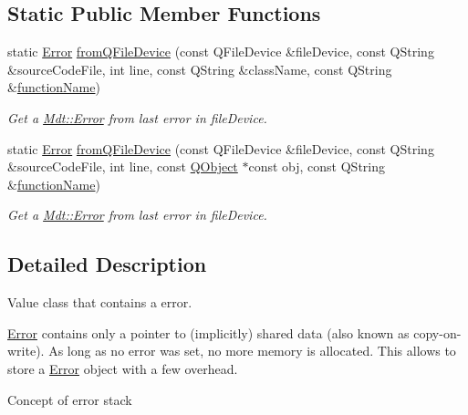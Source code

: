 \subsection*{Static Public Member Functions}
\begin{DoxyCompactItemize}
\item 
static \hyperlink{class_mdt_1_1_error}{Error} \hyperlink{class_mdt_1_1_error_ab8b7aaf497879d1ca16784fae96d3bb3}{from\+Q\+File\+Device} (const Q\+File\+Device \&file\+Device, const Q\+String \&source\+Code\+File, int line, const Q\+String \&class\+Name, const Q\+String \&\hyperlink{class_mdt_1_1_error_a5706a74669219d9672ee20414f805cab}{function\+Name})
\begin{DoxyCompactList}\small\item\em Get a \hyperlink{class_mdt_1_1_error}{Mdt\+::\+Error} from last error in {\itshape file\+Device}. \end{DoxyCompactList}\item 
static \hyperlink{class_mdt_1_1_error}{Error} \hyperlink{class_mdt_1_1_error_a34634c895dff4e9972e8af71dcb10882}{from\+Q\+File\+Device} (const Q\+File\+Device \&file\+Device, const Q\+String \&source\+Code\+File, int line, const \hyperlink{class_q_object}{Q\+Object} $\ast$const obj, const Q\+String \&\hyperlink{class_mdt_1_1_error_a5706a74669219d9672ee20414f805cab}{function\+Name})
\begin{DoxyCompactList}\small\item\em Get a \hyperlink{class_mdt_1_1_error}{Mdt\+::\+Error} from last error in {\itshape file\+Device}. \end{DoxyCompactList}\end{DoxyCompactItemize}


\subsection{Detailed Description}
Value class that contains a error. 

\hyperlink{class_mdt_1_1_error}{Error} contains only a pointer to (implicitly) shared data (also known as copy-\/on-\/write). As long as no error was set, no more memory is allocated. This allows to store a \hyperlink{class_mdt_1_1_error}{Error} object with a few overhead.

Concept of error stack

